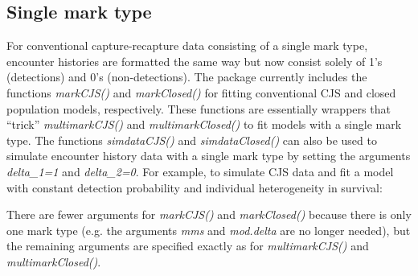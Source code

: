 \documentclass[12pt]{article}
\begin{document}
\subsection{Single mark type}
For conventional capture-recapture data consisting of a single mark type, encounter histories are formatted the same way but now consist solely of 1's (detections) and 0's (non-detections). The package currently includes the functions \textit{markCJS()} and \textit{markClosed()} for fitting conventional CJS and closed population models, respectively. These functions are essentially wrappers that ``trick'' \textit{multimarkCJS()} and \textit{multimarkClosed()} to fit models with a single mark type.  The functions \textit{simdataCJS()} and \textit{simdataClosed()} can also be used to simulate encounter history data with a single mark type by setting the arguments \textit{delta\_1=1} and \textit{delta\_2=0}. For example, to simulate CJS data and fit a model with constant detection probability and individual heterogeneity in survival:
\begin{Schunk}
\end{Schunk}
There are fewer arguments for \textit{markCJS()} and \textit{markClosed()} because there is only one mark type (e.g. the arguments \textit{mms} and \textit{mod.delta} are no longer needed), but the remaining arguments are specified exactly as for \textit{multimarkCJS()} and \textit{multimarkClosed()}. 
\end{document}
